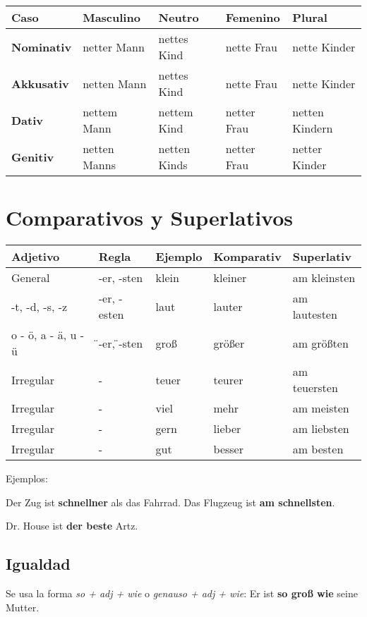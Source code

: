 \begin{tabular}{| l | l | l | l | l |}
\hline
\textbf{Caso} & \textbf{Masculino} & \textbf{Neutro} & \textbf{Femenino} & \textbf{Plural} \\
\hline
\textbf{Nominativ} & netter Mann & nettes Kind & nette Frau &  nette Kinder \\
\textbf{Akkusativ} & netten Mann & nettes Kind & nette Frau & nette Kinder \\
\textbf{Dativ} & nettem Mann & nettem Kind & netter Frau & netten Kindern \\
\textbf{Genitiv} & netten Manns & netten Kinds & netter Frau & netter Kinder \\
\hline
\end{tabular}

\section{Comparativos y Superlativos}
\begin{tabular}{| l | l | l | l | l |}
\hline
\textbf{Adjetivo} & \textbf{Regla} & \textbf{Ejemplo} & \textbf{Komparativ} & \textbf{Superlativ} \\
\hline
General & -er, -sten & klein & kleiner & am kleinsten \\
-t, -d, -s, -z & -er, -esten & laut & lauter & am lautesten \\
o - ö, a - ä, u - ü & \"{ }-er, \"{ }-sten & groß & größer & am größten \\
Irregular & - & teuer & teurer & am teuersten \\
Irregular & - & viel & mehr & am meisten \\
Irregular & - & gern & lieber & am liebsten \\
Irregular & - & gut & besser & am besten \\
\hline
\end{tabular}

Ejemplos: 
\begin{myitemize}
\item Der Zug ist \textbf{schnellner} als das Fahrrad. Das Flugzeug ist \textbf{am schnellsten}.
\item Dr. House ist \textbf{der beste} Artz.
\end{myitemize}

\subsection{Igualdad}
Se usa la forma \textit{so + adj + wie} o \textit{genauso + adj + wie}: Er ist \textbf{so groß wie} seine Mutter.

